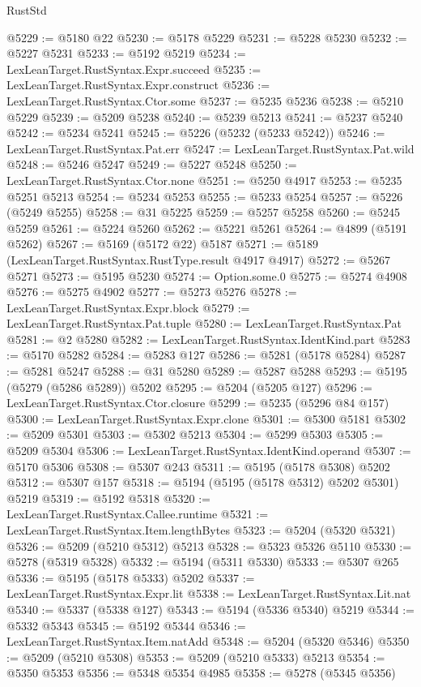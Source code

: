 \begin{lexlean}{RustStd}
\begin{coremodule}
@5229 := @5180 @22
@5230 := @5178 @5229
@5231 := @5228 @5230
@5232 := @5227 @5231
@5233 := @5192 @5219
@5234 := LexLeanTarget.RustSyntax.Expr.succeed
@5235 := LexLeanTarget.RustSyntax.Expr.construct
@5236 := LexLeanTarget.RustSyntax.Ctor.some
@5237 := @5235 @5236
@5238 := @5210 @5229
@5239 := @5209 @5238
@5240 := @5239 @5213
@5241 := @5237 @5240
@5242 := @5234 @5241
@5245 := @5226 (@5232 (@5233 @5242))
@5246 := LexLeanTarget.RustSyntax.Pat.err
@5247 := LexLeanTarget.RustSyntax.Pat.wild
@5248 := @5246 @5247
@5249 := @5227 @5248
@5250 := LexLeanTarget.RustSyntax.Ctor.none
@5251 := @5250 @4917
@5253 := @5235 @5251 @5213
@5254 := @5234 @5253
@5255 := @5233 @5254
@5257 := @5226 (@5249 @5255)
@5258 := @31 @5225
@5259 := @5257 @5258
@5260 := @5245 @5259
@5261 := @5224 @5260
@5262 := @5221 @5261
@5264 := @4899 (@5191 @5262)
@5267 := @5169 (@5172 @22) @5187
@5271 := @5189 (LexLeanTarget.RustSyntax.RustType.result @4917 @4917)
@5272 := @5267 @5271
@5273 := @5195 @5230
@5274 := Option.some.{0}
@5275 := @5274 @4908
@5276 := @5275 @4902
@5277 := @5273 @5276
@5278 := LexLeanTarget.RustSyntax.Expr.block
@5279 := LexLeanTarget.RustSyntax.Pat.tuple
@5280 := LexLeanTarget.RustSyntax.Pat
@5281 := @2 @5280
@5282 := LexLeanTarget.RustSyntax.IdentKind.part
@5283 := @5170 @5282
@5284 := @5283 @127
@5286 := @5281 (@5178 @5284)
@5287 := @5281 @5247
@5288 := @31 @5280
@5289 := @5287 @5288
@5293 := @5195 (@5279 (@5286 @5289)) @5202
@5295 := @5204 (@5205 @127)
@5296 := LexLeanTarget.RustSyntax.Ctor.closure
@5299 := @5235 (@5296 @84 @157)
@5300 := LexLeanTarget.RustSyntax.Expr.clone
@5301 := @5300 @5181
@5302 := @5209 @5301
@5303 := @5302 @5213
@5304 := @5299 @5303
@5305 := @5209 @5304
@5306 := LexLeanTarget.RustSyntax.IdentKind.operand
@5307 := @5170 @5306
@5308 := @5307 @243
@5311 := @5195 (@5178 @5308) @5202
@5312 := @5307 @157
@5318 := @5194 (@5195 (@5178 @5312) @5202 @5301) @5219
@5319 := @5192 @5318
@5320 := LexLeanTarget.RustSyntax.Callee.runtime
@5321 := LexLeanTarget.RustSyntax.Item.lengthBytes
@5323 := @5204 (@5320 @5321)
@5326 := @5209 (@5210 @5312) @5213
@5328 := @5323 @5326 @5110
@5330 := @5278 (@5319 @5328)
@5332 := @5194 (@5311 @5330)
@5333 := @5307 @265
@5336 := @5195 (@5178 @5333) @5202
@5337 := LexLeanTarget.RustSyntax.Expr.lit
@5338 := LexLeanTarget.RustSyntax.Lit.nat
@5340 := @5337 (@5338 @127)
@5343 := @5194 (@5336 @5340) @5219
@5344 := @5332 @5343
@5345 := @5192 @5344
@5346 := LexLeanTarget.RustSyntax.Item.natAdd
@5348 := @5204 (@5320 @5346)
@5350 := @5209 (@5210 @5308)
@5353 := @5209 (@5210 @5333) @5213
@5354 := @5350 @5353
@5356 := @5348 @5354 @4985
@5358 := @5278 (@5345 @5356)

\end{coremodule}
\end{lexlean}
